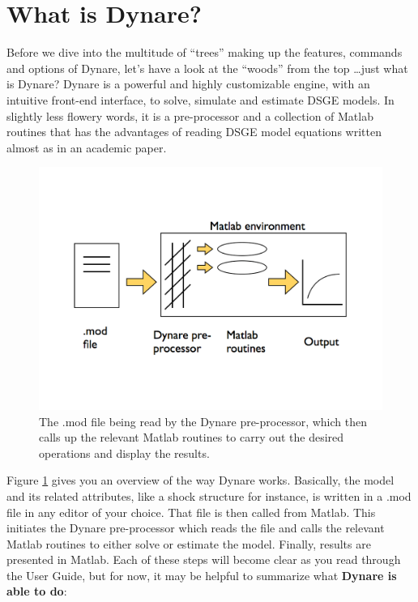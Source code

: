 \section{What is Dynare?}
Before we dive into the multitude of ``trees'' making up the features, commands and options of Dynare, let's have a look at the ``woods'' from the top \ldots just what is Dynare? Dynare is a powerful and highly customizable engine, with an intuitive front-end interface, to solve, simulate and estimate DSGE models. In slightly less flowery words, it is a pre-processor and a collection of Matlab routines that has the advantages of reading DSGE model equations written almost as in an academic paper. \\

\begin{figure} \label{fig:dyn}
\begin{center} 
\includegraphics[width=1.0\textwidth]{P_DynareStruct2} 
\end{center} 
\caption[Dynare, a bird's eyeview]{The .mod file being read by the Dynare pre-processor, which then calls up the relevant Matlab routines to carry out the desired operations and display the results.} 
\end{figure}
Figure \ref{fig:dyn} gives you an overview of the way Dynare works. Basically, the model and its related attributes, like a shock structure for instance, is written in a .mod file in any editor of your choice. That file is then called from Matlab. This initiates the Dynare pre-processor which reads the file and calls the relevant Matlab routines to either solve or estimate the model. Finally, results are presented in Matlab. Each of these steps will become clear as you read through the User Guide, but for now, it may be helpful to summarize what \textbf{Dynare is able to do}:
